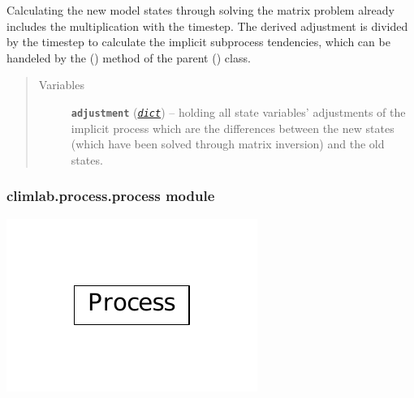 \documentclass[a4paper,10pt,english]{sphinxmanual}
\begin{document}
\begin{fulllineitems}
\begin{fulllineitems}
Calculating the new model states through solving the matrix problem 
already includes the multiplication with the timestep. The derived 
adjustment is divided by the timestep to calculate the implicit 
subprocess tendencies, which can be handeled by the 
{\hyperref[api/climlab.process:climlab.process.time_dependent_process.TimeDependentProcess.compute]{\emph{}}} ()
method of the parent 
{\hyperref[api/climlab.process:climlab.process.time_dependent_process.TimeDependentProcess]{\emph{}}} () class.
\begin{quote}\begin{description}
\item[{Variables}] \leavevmode
\textbf{\texttt{adjustment}} (\href{http://docs.python.org/2.7/library/stdtypes.html\#dict}{\emph{\texttt{dict}}}) -- holding all state variables' adjustments
of the implicit process which are the 
differences between the new states (which have 
been solved through matrix inversion) and the 
old states.

\end{description}\end{quote}

\end{fulllineitems}


\end{fulllineitems}



\subsubsection{climlab.process.process module}
\label{api/climlab.process:climlab-process-process-module}
\includegraphics{inheritance-8eb24c41e1d3c85885c11e2e65fb208089ce0aa8.pdf}
\label{api/climlab.process:module-climlab.process.process}
\end{document}
